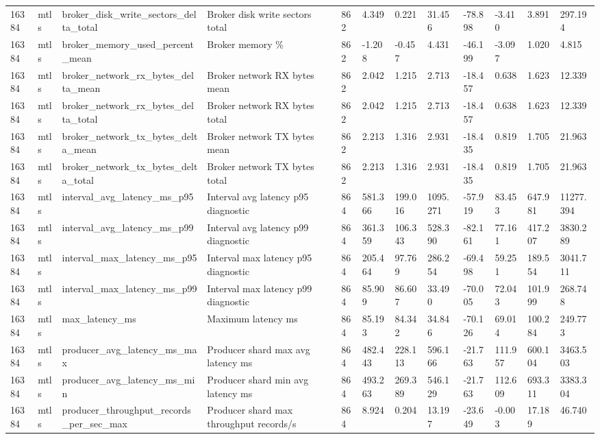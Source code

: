 \begin{longtable}{llllllllllll}
16384 & mtls & broker\_disk\_write\_sectors\_delta\_total & Broker disk write sectors total & 862 & 4.349 & 0.221 & 31.456 & -78.898 & -3.410 & 3.891 & 297.194 \\
16384 & mtls & broker\_memory\_used\_percent\_mean & Broker memory \% & 862 & -1.208 & -0.457 & 4.431 & -46.199 & -3.097 & 1.020 & 4.815 \\
16384 & mtls & broker\_network\_rx\_bytes\_delta\_mean & Broker network RX bytes mean & 862 & 2.042 & 1.215 & 2.713 & -18.457 & 0.638 & 1.623 & 12.339 \\
16384 & mtls & broker\_network\_rx\_bytes\_delta\_total & Broker network RX bytes total & 862 & 2.042 & 1.215 & 2.713 & -18.457 & 0.638 & 1.623 & 12.339 \\
16384 & mtls & broker\_network\_tx\_bytes\_delta\_mean & Broker network TX bytes mean & 862 & 2.213 & 1.316 & 2.931 & -18.435 & 0.819 & 1.705 & 21.963 \\
16384 & mtls & broker\_network\_tx\_bytes\_delta\_total & Broker network TX bytes total & 862 & 2.213 & 1.316 & 2.931 & -18.435 & 0.819 & 1.705 & 21.963 \\
16384 & mtls & interval\_avg\_latency\_ms\_p95 & Interval avg latency p95 diagnostic & 864 & 581.366 & 199.016 & 1095.271 & -57.919 & 83.453 & 647.981 & 11277.394 \\
16384 & mtls & interval\_avg\_latency\_ms\_p99 & Interval avg latency p99 diagnostic & 864 & 361.359 & 106.343 & 528.390 & -82.161 & 77.161 & 417.207 & 3830.289 \\
16384 & mtls & interval\_max\_latency\_ms\_p95 & Interval max latency p95 diagnostic & 864 & 205.464 & 97.769 & 286.254 & -69.498 & 59.251 & 189.554 & 3041.711 \\
16384 & mtls & interval\_max\_latency\_ms\_p99 & Interval max latency p99 diagnostic & 864 & 85.909 & 86.607 & 33.490 & -70.005 & 72.043 & 101.999 & 268.748 \\
16384 & mtls & max\_latency\_ms & Maximum latency ms & 864 & 85.193 & 84.342 & 34.846 & -70.126 & 69.014 & 100.284 & 249.773 \\
16384 & mtls & producer\_avg\_latency\_ms\_max & Producer shard max avg latency ms & 864 & 482.443 & 228.113 & 596.166 & -21.763 & 111.957 & 600.104 & 3463.503 \\
16384 & mtls & producer\_avg\_latency\_ms\_min & Producer shard min avg latency ms & 864 & 493.263 & 269.389 & 546.129 & -21.763 & 112.609 & 693.311 & 3383.304 \\
16384 & mtls & producer\_throughput\_records\_per\_sec\_max & Producer shard max throughput records/s & 864 & 8.924 & 0.204 & 13.197 & -23.649 & -0.003 & 17.189 & 46.740 \\

\end{longtable}
